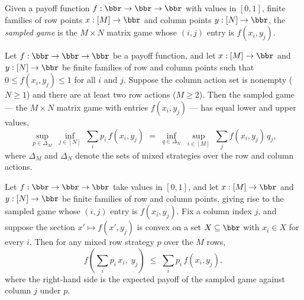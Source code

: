 \begin{definition}
\label{OnlineLearning.sampledGame}
\leanok
{}
Given a payoff function $f : \bbr \to \bbr \to \bbr$ with values in $[0,1]$,
finite families of row points $x : [M] \to \bbr$ and column points
$y : [N] \to \bbr$, the \emph{sampled game} is the $M\times N$ matrix game
whose $(i,j)$ entry is $f(x_i, y_j)$.
\end{definition}

\begin{theorem}
\label{OnlineLearning.finite_sampled_minimax_value}
\leanok
{}
Let $f : \bbr \to \bbr \to \bbr$ be a payoff function, and let $x : [M] \to \bbr$ and $y
: [N] \to \bbr$ be finite families of row and column points such that $0 \le f(x_i, y_j)
\le 1$ for all $i$ and $j$. Suppose the column action set is nonempty ($N \ge 1$) and
there are at least two row actions ($M \ge 2$). Then the sampled game — the $M \times N$
matrix game with entries $f(x_i, y_j)$ — has equal lower and upper values,
\[
  \sup_{p \in \Delta_M}\; \inf_{j \in [N]}\; \sum_{i} p_i\, f(x_i, y_j)
  \;=\;
  \inf_{q \in \Delta_N}\; \sup_{i \in [M]}\; \sum_{j} f(x_i, y_j)\, q_j,
\]
where $\Delta_M$ and $\Delta_N$ denote the sets of mixed strategies over the row and
column actions.
\end{theorem}

\begin{lemma}
\label{OnlineLearning.sampled_payoffVsPure_ge_convex_combo}
\leanok
{}
Let $f : \bbr \to \bbr \to \bbr$ take values in $[0,1]$, and let $x : [M] \to \bbr$ and
$y : [N] \to \bbr$ be finite families of row and column points, giving rise to the
sampled game whose $(i,j)$ entry is $f(x_i, y_j)$. Fix a column index $j$, and suppose
the section $x' \mapsto f(x', y_j)$ is convex on a set $X \subseteq \bbr$ with $x_i \in
X$ for every $i$. Then for any mixed row strategy $p$ over the $M$ rows,
\[
  f\!\left(\sum_{i} p_i\, x_i,\; y_j\right) \;\le\; \sum_{i} p_i\, f(x_i, y_j),
\]
where the right-hand side is the expected payoff of the sampled game against column $j$
under $p$.
\end{lemma}

